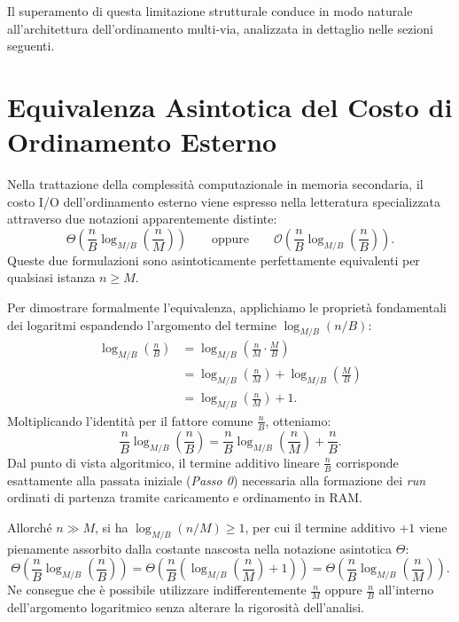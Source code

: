 Il superamento di questa limitazione strutturale conduce in modo naturale all'architettura dell'ordinamento multi-via, analizzata in dettaglio nelle sezioni seguenti.

\section{Equivalenza Asintotica del Costo di Ordinamento Esterno}
\label{sec:sorting-cost-equivalence}

Nella trattazione della complessità computazionale in memoria secondaria, il costo I/O dell'ordinamento esterno viene espresso nella letteratura specializzata~\cite{aggarwal1988} attraverso due notazioni apparentemente distinte:
\begin{equation}
  \Theta\left(\frac{n}{B} \log_{M/B}\left(\frac{n}{M}\right)\right)
  \qquad \text{oppure} \qquad
  \mathcal{O}\left(\frac{n}{B} \log_{M/B}\left(\frac{n}{B}\right)\right).
\end{equation}
Queste due formulazioni sono asintoticamente perfettamente equivalenti per qualsiasi istanza $n \ge M$.

Per dimostrare formalmente l'equivalenza, applichiamo le proprietà fondamentali dei logaritmi espandendo l'argomento del termine $\log_{M/B}(n/B)$:
\begin{align}
  \log_{M/B}\left(\frac{n}{B}\right)
  &= \log_{M/B}\left(\frac{n}{M} \cdot \frac{M}{B}\right) \nonumber \\
  &= \log_{M/B}\left(\frac{n}{M}\right) + \log_{M/B}\left(\frac{M}{B}\right) \nonumber \\
  &= \log_{M/B}\left(\frac{n}{M}\right) + 1.
  \label{eq:log-equivalence}
\end{align}
Moltiplicando l'identità per il fattore comune $\frac{n}{B}$, otteniamo:
\begin{equation}
  \frac{n}{B} \log_{M/B}\left(\frac{n}{B}\right)
  = \frac{n}{B} \log_{M/B}\left(\frac{n}{M}\right) + \frac{n}{B}.
\end{equation}
Dal punto di vista algoritmico, il termine additivo lineare $\frac{n}{B}$ corrisponde esattamente alla passata iniziale (\textit{Passo 0}) necessaria alla formazione dei \textit{run} ordinati di partenza tramite caricamento e ordinamento in RAM. 

Allorché $n \gg M$, si ha $\log_{M/B}(n/M) \ge 1$, per cui il termine additivo $+1$ viene pienamente assorbito dalla costante nascosta nella notazione asintotica $\Theta$:
\begin{equation}
  \Theta\left(\frac{n}{B} \log_{M/B}\left(\frac{n}{B}\right)\right)
  = \Theta\left(\frac{n}{B} \left(\log_{M/B}\left(\frac{n}{M}\right) + 1\right)\right)
  = \Theta\left(\frac{n}{B} \log_{M/B}\left(\frac{n}{M}\right)\right).
\end{equation}
Ne consegue che è possibile utilizzare indifferentemente $\frac{n}{M}$ oppure $\frac{n}{B}$ all'interno dell'argomento logaritmico senza alterare la rigorosità dell'analisi.
